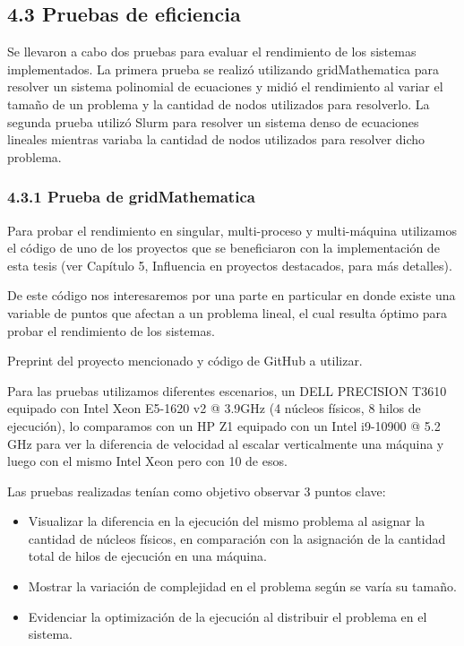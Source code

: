 \begin{spacing}{1.5}
  \subsection{4.3 Pruebas de eficiencia}  \label{chap:4.3}

      Se llevaron a cabo dos pruebas para evaluar el rendimiento de los sistemas implementados. La primera prueba se realizó utilizando gridMathematica para resolver un sistema polinomial de ecuaciones y midió el rendimiento al variar el tamaño de un problema y la cantidad de nodos utilizados para resolverlo. La segunda prueba utilizó Slurm para resolver un sistema denso de ecuaciones lineales mientras variaba la cantidad de nodos utilizados para resolver dicho problema.   

      \subsubsection{4.3.1 Prueba de gridMathematica}

      Para probar el rendimiento en singular, multi-proceso y multi-máquina utilizamos el código de uno de los proyectos que se beneficiaron con la implementación de esta tesis (ver Capítulo 5, Influencia en proyectos destacados, para más detalles).

      De este código nos interesaremos por una parte en particular en donde existe una variable de puntos que afectan a un problema lineal, el cual resulta óptimo para probar el rendimiento de los sistemas.

      Preprint del proyecto mencionado y código de GitHub a utilizar. \cite{preprint} \cite{git}

      Para las pruebas utilizamos diferentes escenarios, un DELL PRECISION T3610 equipado con Intel Xeon E5-1620 v2 @ 3.9GHz (4 núcleos físicos, 8 hilos de ejecución), lo comparamos con un HP Z1 equipado con un Intel i9-10900 @ 5.2 GHz para ver la diferencia de velocidad al escalar verticalmente una máquina y luego con el mismo Intel Xeon pero con 10 de esos.

      Las pruebas realizadas tenían como objetivo observar 3 puntos clave:

      \begin{itemize}
            \item Visualizar la diferencia en la ejecución del mismo problema al asignar la cantidad de núcleos físicos, en comparación con la asignación de la cantidad total de hilos de ejecución en una máquina.
            \item Mostrar la variación de complejidad en el problema según se varía su tamaño.
            \item Evidenciar la optimización de la ejecución al distribuir el problema en el sistema.
      \end{itemize}


\end{spacing}
